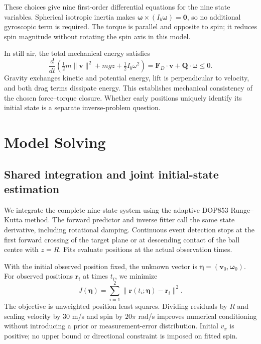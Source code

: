 \documentclass[12pt,letterpaper]{article}
\begin{document}
These choices give nine first-order differential equations for the nine state variables. Spherical isotropic inertia makes $\boldsymbol\omega\times(I_b\boldsymbol\omega)=\boldsymbol0$, so no additional gyroscopic term is required. The torque is parallel and opposite to spin; it reduces spin magnitude without rotating the spin axis in this model.

In still air, the total mechanical energy satisfies
\begin{equation}
\frac{d}{dt}\left(\tfrac12m\|\boldsymbol v\|^2+mgz+\tfrac12I_b\omega^2\right)
=\boldsymbol F_D\cdot\boldsymbol v+\boldsymbol Q\cdot\boldsymbol\omega\le0.
\label{eq:energy}\end{equation}
Gravity exchanges kinetic and potential energy, lift is perpendicular to velocity, and both drag terms dissipate energy. This establishes mechanical consistency of the chosen force--torque closure. Whether early positions uniquely identify its initial state is a separate inverse-problem question.

\section{Model Solving}\label{sec:solving}
\subsection{Shared integration and joint initial-state estimation}
We integrate the complete nine-state system using the adaptive DOP853 Runge--Kutta method. The forward predictor and inverse fitter call the same state derivative, including rotational damping. Continuous event detection stops at the first forward crossing of the target plane or at descending contact of the ball centre with $z=R$. Fits evaluate positions at the actual observation times.

With the initial observed position fixed, the unknown vector is $\boldsymbol\eta=(\boldsymbol v_0,\boldsymbol\omega_0)$. For observed positions $\boldsymbol r_i$ at times $t_i$, we minimize
\begin{equation}
J(\boldsymbol\eta)=\sum_{i=1}^{2}\|\boldsymbol r(t_i;\boldsymbol\eta)-\boldsymbol r_i\|^2.
\label{eq:joint-fit}\end{equation}
The objective is unweighted position least squares. Dividing residuals by $R$ and scaling velocity by 30 m/s and spin by $20\pi$ rad/s improves numerical conditioning without introducing a prior or measurement-error distribution. Initial $v_x$ is positive; no upper bound or directional constraint is imposed on fitted spin.
\end{document}
